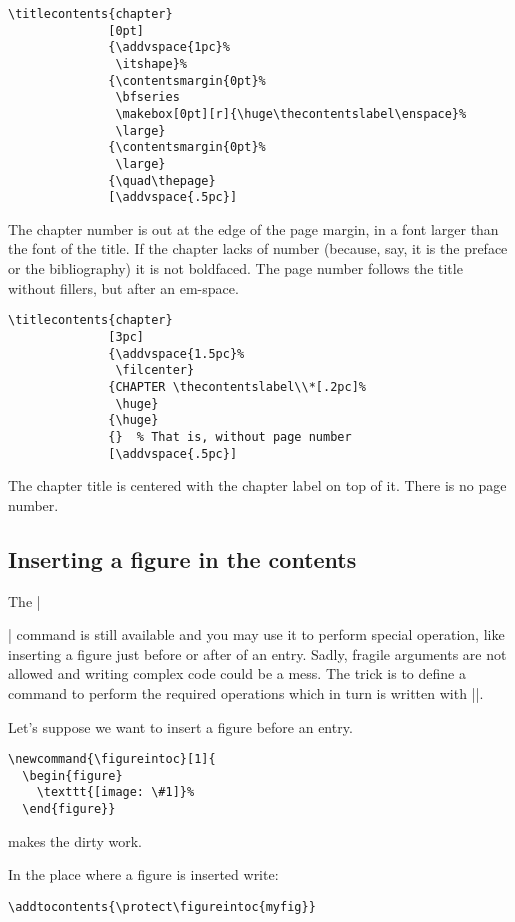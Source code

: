 \documentclass[a4paper]{ltxguide}
\begin{document}
\begin{verbatim}
\titlecontents{chapter}
              [0pt]
              {\addvspace{1pc}%
               \itshape}%
              {\contentsmargin{0pt}%
               \bfseries
               \makebox[0pt][r]{\huge\thecontentslabel\enspace}%
               \large}
              {\contentsmargin{0pt}%
               \large}
              {\quad\thepage}
              [\addvspace{.5pc}]
\end{verbatim}

The chapter number is out at the edge of the page margin, in a font
larger than the font of the title. If the chapter lacks of number
(because, say, it is the preface or the bibliography) it is not
boldfaced. The page number follows the title without fillers, but
after an em-space.

\begin{verbatim}
\titlecontents{chapter}
              [3pc]
              {\addvspace{1.5pc}%
               \filcenter}
              {CHAPTER \thecontentslabel\\*[.2pc]%
               \huge}
              {\huge}
              {}  % That is, without page number
              [\addvspace{.5pc}]
\end{verbatim}

The chapter title is centered with the chapter label on top
of it. There is no page number.

\subsection{Inserting a figure in the contents}

The |\addtocontents| command is still available and you may use
it to perform special operation, like inserting a figure just before
or after of an entry. Sadly, fragile
arguments are not allowed and writing complex code could be a mess.
The trick is to define a command to perform the required operations
which in turn is written with |\protect|.

Let's suppose we want to insert a figure before an entry.
\begin{verbatim}
\newcommand{\figureintoc}[1]{
  \begin{figure}
    \texttt{[image: \#1]}%
  \end{figure}}
\end{verbatim}
makes the dirty work.

In the place where a figure is inserted write:
\begin{verbatim}
\addtocontents{\protect\figureintoc{myfig}}
\end{verbatim}
\end{document}
